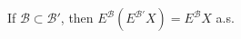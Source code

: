If $\mathcal{B} \subset \mathcal{B}'$, then $E^{\mathcal{B}}(E^{\mathcal{B}'}X) = E^{\mathcal{B}}X$ a.s.

